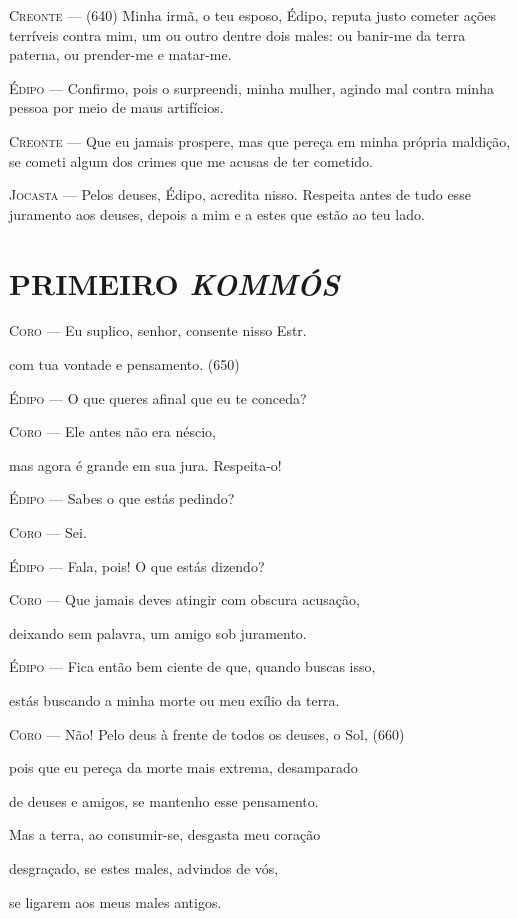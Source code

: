 \textsc{Creonte} --- (640) Minha irmã, o teu esposo, Édipo, reputa justo cometer ações
terríveis contra mim, um ou outro dentre dois males: ou banir-me da
terra paterna, ou prender-me e matar-me.

\textsc{Édipo} --- Confirmo, pois o surpreendi, minha mulher, agindo mal contra minha
pessoa por meio de maus artifícios.

\textsc{Creonte} --- Que eu jamais prospere, mas que pereça em minha própria maldição, se
cometi algum dos crimes que me acusas de ter cometido.

\textsc{Jocasta} --- Pelos deuses, Édipo, acredita nisso. Respeita antes de tudo esse
juramento aos deuses, depois a mim e a estes que estão ao teu lado.

\section{PRIMEIRO \emph{KOMMÓS}}

\textsc{Coro} --- Eu suplico, senhor, consente nisso Estr.

com tua vontade e pensamento. (650)

\textsc{Édipo} --- O que queres afinal que eu te conceda?

\textsc{Coro} --- Ele antes não era néscio,

mas agora é grande em sua jura. Respeita-o!

\textsc{Édipo} --- Sabes o que estás pedindo?

\textsc{Coro} --- Sei.

\textsc{Édipo} --- Fala, pois! O que estás dizendo?

\textsc{Coro} --- Que jamais deves atingir com obscura acusação,

deixando sem palavra, um amigo sob juramento.

\textsc{Édipo} --- Fica então bem ciente de que, quando buscas isso,

estás buscando a minha morte ou meu exílio da terra.

\textsc{Coro} --- Não! Pelo deus à frente de todos os deuses, o Sol, (660)

pois que eu pereça da morte mais extrema, desamparado

de deuses e amigos, se mantenho esse pensamento.

Mas a terra, ao consumir-se, desgasta meu coração

desgraçado, se estes males, advindos de vós,

se ligarem aos meus males antigos.

